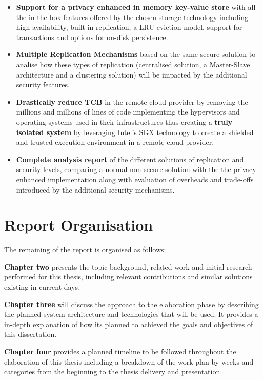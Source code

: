 \begin{itemize}
  \item \textbf{Support for a privacy enhanced in memory key-value store} with all the in-the-box features offered by the chosen storage technology including high availability, built-in replication, a \gls{LRU} eviction model, support for transactions and options for on-disk persistence.
  \item \textbf{Multiple Replication Mechanisms} based on the same secure solution to analise how these types of replication (centralised solution, a Master-Slave architecture and a clustering solution) will be impacted by the additional security features.
  \item \textbf{Drastically reduce TCB} in the remote cloud provider by removing the millions and millions of lines of code implementing the hypervisors and operating systems used in their infrastructures thus creating a \textbf{truly isolated system} by leveraging Intel's \gls{SGX} technology to create a shielded and trusted execution environment in a remote cloud provider.
  \item \textbf{Complete analysis report} of the different solutions of replication and security levels, comparing a normal non-secure solution with the the privacy-enhanced implementation along with evaluation of overheads and trade-offs introduced by the additional security mechanisms.
\end{itemize}

\section{Report Organisation}
\label{sec:report_organisation}

The remaining of the report is organised as follows:

\textbf{Chapter two} presents the topic background, related work and initial research performed for this thesis, including relevant contributions and similar solutions existing in current days.

\textbf{Chapter three} will discuss the approach to the elaboration phase by describing the planned system architecture and technologies that will be used. It provides a in-depth explanation of how its planned to achieved the goals and objectives of this dissertation.

\textbf{Chapter four} provides a planned timeline to be followed throughout the elaboration of this thesis including a breakdown of the work-plan by weeks and categories from the beginning to the thesis delivery and presentation.